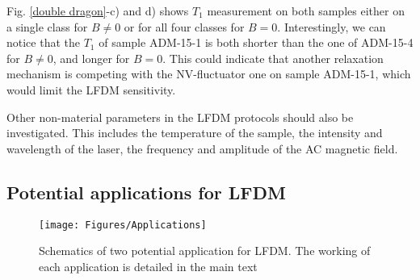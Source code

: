 \documentclass[a4paper,11pt]{report}
\begin{document}
Fig. \ref{double dragon}-c) and d) shows $T_1$ measurement on both samples either on a single class for $B\neq 0$ or for all four classes for $B=0$. Interestingly, we can notice that the $T_1$ of sample ADM-15-1 is both shorter than the one of ADM-15-4 for $B\neq 0$, and longer for $B=0$. This could indicate that another relaxation mechanism is competing with the NV-fluctuator one on sample ADM-15-1, which would limit the LFDM sensitivity.

%
%

Other non-material parameters in the LFDM protocols should also be investigated. This includes the temperature of the sample, the intensity and wavelength of the laser, the frequency and amplitude of the AC magnetic field. 


\subsection{Potential applications for LFDM}

\begin{figure}[h!]
\centering
\texttt{[image: Figures/Applications]}
\caption{Schematics of two potential application for LFDM. The working of each application is detailed in the main text}
\label{applications}
\end{figure}
\end{document}
